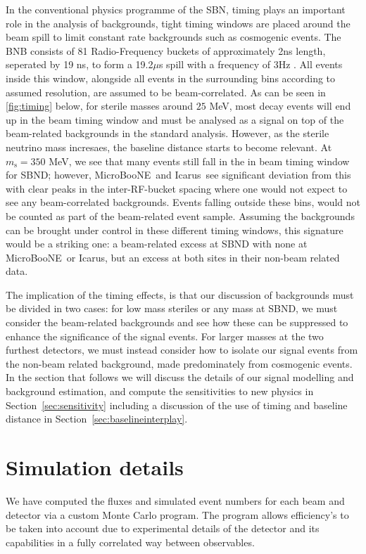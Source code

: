 \documentclass[11pt, a4paper]{article}
\newcommand{\refsec}[1]{Section~\ref{#1}}
\def\muboone{MicroBooNE}
\def\icarus{Icarus}
\begin{document}
In the conventional physics programme of the SBN, timing plays an important
role in the analysis of backgrounds, tight timing windows are placed around the
beam spill to limit constant rate backgrounds such as cosmogenic events. The
BNB consists of 81 Radio-Frequency buckets of approximately 2ns length,
seperated by 19 ns, to form a 19.2$\mu$s spill with a frequency of 3Hz
\cite{Antonello:2015ea}.  All events inside this window, alongside all events
in the surrounding bins according to assumed resolution, are assumed to be
beam-correlated.  As can be seen in \ref{fig:timing} below, for sterile masses
around $25$ MeV, most decay events will end up in the beam timing window and
must be analysed as a signal on top of the beam-related backgrounds in the
standard analysis. However, as the sterile neutrino mass incresaes, the
baseline distance starts to become relevant. At $m_{\text{s}}=350$ MeV, we see
that many events still fall in the in beam timing window for SBND; however,
\muboone\ and \icarus\ see significant deviation from this with clear peaks in
the inter-RF-bucket spacing where one would not expect to see any
beam-correlated backgrounds. Events falling outside these bins, would not be
counted as part of the beam-related event sample. Assuming the backgrounds can
be brought under control in these different timing windows, this signature
would be a striking one: a beam-related excess at SBND with none at \muboone\
or \icarus, but an excess at both sites in their non-beam related data.

The implication of the timing effects, is that our discussion of backgrounds
must be divided in two cases: for low mass steriles or any mass at SBND, we
must consider the beam-related backgrounds and see how these can be suppressed
to enhance the significance of the signal events. For larger masses at the two
furthest detectors, we must instead consider how to isolate our signal events
from the non-beam related background, made predominately from cosmogenic
events. In the section that follows we will discuss the details of our signal
modelling and background estimation, and compute the sensitivities to new
physics in \refsec{sec:sensitivity} including a discussion of the 
use of timing and baseline distance in \refsec{sec:baselineinterplay}. 

\section{Simulation details}

We have computed the fluxes and simulated event numbers for each beam and
detector via a custom Monte Carlo program. The program allows efficiency's to
be taken into account due to experimental details of the detector and its
capabilities in a fully correlated way between observables. 
\end{document}
